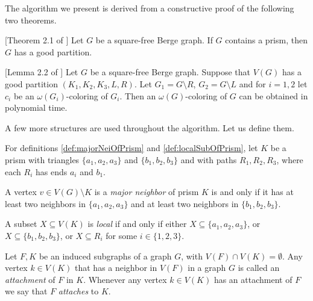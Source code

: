 The algorithm we present is derived from a constructive proof of the following two theorems.

\begin{theorem}{}[Theorem 2.1 of \cite{coloringSquareFree}]
  Let $G$ be a square-free Berge graph. If $G$ contains a prism, then $G$ has a good partition.
\end{theorem}

\begin{theorem}{}[Lemma 2.2 of \cite{coloringSquareFree}]
  Let $G$ be a square-free Berge graph. Suppose that $V(G)$ has a good partition $(K_1, K_2, K_3, L, R)$. Let $G_1 = G \setminus R$, $G_2 = G \setminus L$ and for $i = 1,2$ let $c_i$ be an $\omega(G_i)$-coloring of $G_i$. Then an $\omega(G)$-coloring of $G$ can be obtained in polynomial time.
\end{theorem}

A few more structures are used throughout the algorithm. Let us define them.

For definitions \ref{def:majorNeiOfPrism} and \ref{def:localSubOfPrism}, let $K$ be a prism with triangles $\{a_1, a_2, a_3\}$ and $\{b_1, b_2, b_3\}$ and with paths $R_1, R_2, R_3$, where each $R_i$ has ends $a_i$ and $b_1$.

\begin{defnTwo}
  A vertex $v \in V(G) \setminus K$ is a \emph{major neighbor} of prism $K$ is and only if it has at least two neighbors in $\{a_1, a_2, a_3\}$ and at least two neighbors in $\{b_1, b_2, b_3\}$.
  \label{def:majorNeiOfPrism}
\end{defnTwo}

\begin{defnTwo}
  A subset $X \subseteq V(K)$ is \emph{local} if and only if either $X \subseteq \{a_1, a_2, a_3\}$, or $X \subseteq \{b_1, b_2, b_3\}$, or $X \subseteq R_i$ for some $i \in \{1, 2, 3\}$.
  \label{def:localSubOfPrism}
\end{defnTwo}

\begin{defnTwo}[attachment]
  Let $F, K$ be an induced subgraphs of a graph $G$, with $V(F) \cap V(K) = \emptyset$. Any vertex $k \in V(K)$ that has a neighbor in $V(F)$ in a graph $G$ is called an \emph{attachment} of $F$ in $K$. Whenever any vertex $k \in V(K)$ has an attachment of $F$ we say that $F$ \emph{attaches} to $K$.
\end{defnTwo}

